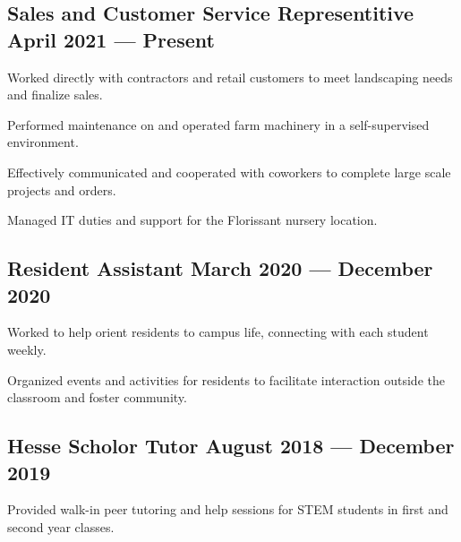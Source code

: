 \subsection{{Sales and Customer Service Representitive  \hfill April 2021 --- Present}}
\begin{zitemize}
\item Worked directly with contractors and retail customers to meet landscaping needs and finalize sales.
\item Performed maintenance on and operated farm machinery in a self-supervised environment.
\item Effectively communicated and cooperated with coworkers to complete large scale projects and orders.
\item Managed IT duties and support for the Florissant nursery location.
\end{zitemize}


\subsection{{Resident Assistant \hfill March 2020 --- December 2020}}
\begin{zitemize}
\item Worked to help orient residents to campus life, connecting with each student weekly.
\item Organized events and activities for residents to facilitate interaction outside the classroom and foster community.
\end{zitemize}


\subsection{{Hesse Scholor Tutor \hfill August 2018 --- December 2019}}
\begin{zitemize}
\item Provided walk-in peer tutoring and help sessions for STEM students in first and second year classes.
\end{zitemize}


